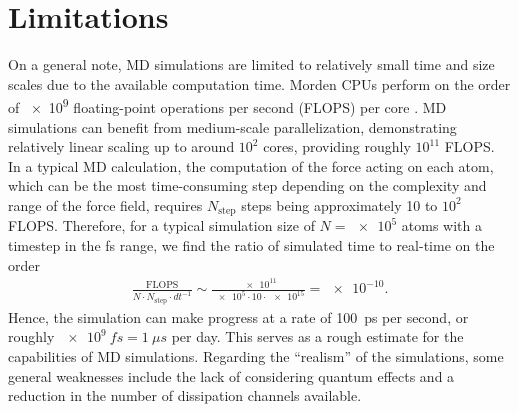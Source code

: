 




\section{Limitations}
On a general note, \acrshort{MD} simulations are limited to relatively small
time and size scales due to the available computation time. Morden CPUs perform
on the order of \num{e9} floating-point operations per second (FLOPS) per core
\cite{Vanossi_2013}. \acrshort{MD} simulations can benefit from medium-scale
parallelization, demonstrating relatively linear scaling up to around $10^2$
cores, providing roughly $10^{11}$ FLOPS. In a typical \acrshort{MD} calculation, the computation of the force acting on each atom, which can be the most time-consuming step depending on the complexity and range of the force field, requires $N_{\text{step}}$ steps being approximately 10 to $10^2$ FLOPS. Therefore, for a typical simulation size of $N = \num{e5}$ atoms with a timestep in the fs range, we find the ratio of simulated time to real-time on the order 
\begin{align*}
  \frac{\text{FLOPS}}{N\cdot N_{\text{step}} \cdot dt^{-1}} \sim \frac{\num{e11}}{\num{e5}\cdot 10 \cdot \num{e15}} = \num{e-10}.
\end{align*}
Hence, the simulation can make progress at a rate of \SI{100}{ps} per second, or roughly $\SI{e9}{fs}=\SI{1}{\mu s}$ per day. This serves as a rough estimate for the capabilities of \acrshort{MD} simulations. Regarding the ``realism'' of the simulations, some general weaknesses include the lack of considering quantum effects and a reduction in the number of dissipation channels available.


